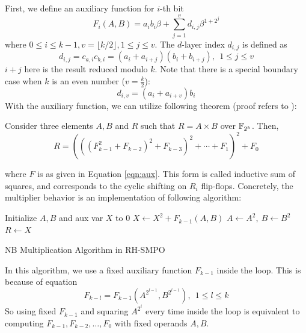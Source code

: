 \begin{Proof}
First, we define an auxiliary function for $i$-th bit 
\begin{equation}
\label{eqn:aux}
F_i(A,B) = a_ib_i\beta + \sum_{j=1}^v d_{i,j}\beta^{1+2^j}
\end{equation}
where $0\leq i\leq k-1, v = \lfloor k/2\rfloor, 1\leq j \leq v$.
The $d$-layer index $d_{i,j}$ is defined as
\begin{equation}
\label{eqn:auxDC}
d_{i,j} = c_{a,i} c_{b,i} = (a_i+a_{i+j})(b_i+b_{i+j}),~~1\leq j\leq v
\end{equation}
$i+j$ here is the result reduced modulo $k$. Note that there is a special boundary case when
$k$ is an even number ($v = \frac{k}{2}$):
$$d_{i,v} = (a_i+a_{i+v})b_i$$
With the auxiliary function, we can utilize following theorem (proof refers to \cite{RHmulti}):
\begin{Theorem}
Consider three elements $A,B$ and $R$ such that $R=A\times B$ over ${\mathbb{F}}_{2^k}$. Then,
$$R=(((F_{k-1}^2+F_{k-2})^2+F_{k-3})^2+\cdots+F_1)^2+F_0$$
\end{Theorem}
where $F$ is as given in Equation \ref{eqn:aux}.
This form is called inductive sum of squares, and corresponds to the cyclic shifting on 
$R_i$ flip-flops. Concretely, the multiplier behavior is an implementation of 
following algorithm:

\begin{algorithm}[H]
\SetAlgoNoLine

  Initialize $A,B$ and aux var $X$ to 0\;
  {
	$X \gets X^2+F_{k-1}(A,B)$ 
	$A\gets A^2,~B\gets B^2$ 
  }
  $R\gets X$
\caption{NB Multiplication Algorithm in RH-SMPO \cite{RHmulti}}\label{alg:RHmulti}
\end{algorithm}

In this algorithm, we use a fixed auxiliary function $F_{k-1}$ inside the loop.
This is because of equation
$$F_{k-l} = F_{k-1}(A^{2^{l-1}},B^{2^{l-1}}),~~1\le l\le k$$
So using fixed $F_{k-1}$ and squaring $A^{2^i}$ every time inside the loop is equivalent to computing 
$F_{k-1},F_{k-2},\dots,F_0$ with fixed operands $A,B$.
\end{Proof}

